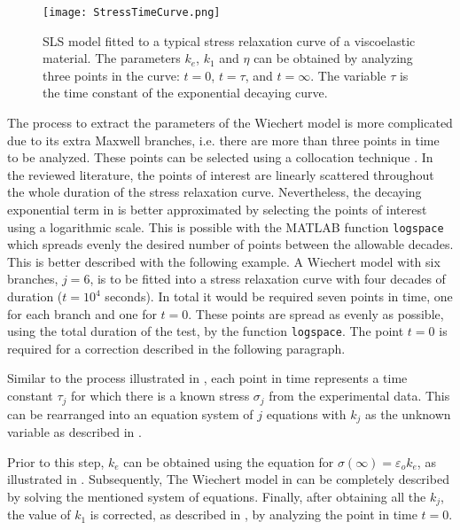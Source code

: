 \begin{figure}[htb!]
	\centering
    \texttt{[image: StressTimeCurve.png]}
    \caption{SLS model fitted to a typical stress relaxation curve of a viscoelastic material. The parameters $k_e$, $k_1$ and $\eta$ can be obtained by analyzing three points in the curve: $t=0$, $t=\tau$, and $t=\infty$. The variable $\tau$ is the time constant of the exponential decaying curve.}
    \label{fig:stressTimeCurve}
\end{figure}

The process to extract the parameters of the Wiechert model is more complicated due to its extra Maxwell branches, i.e. there are more than three points in time to be analyzed. These points can be selected using a collocation technique \cite{roylance2001engineering,machiraju2006viscoelastic}. In the reviewed literature, the points of interest are linearly scattered throughout the whole duration of the stress relaxation curve. Nevertheless, the decaying exponential term in  is better approximated by selecting the points of interest using a logarithmic scale. This is possible with the MATLAB function \texttt{logspace} which spreads evenly the desired number of points between the allowable decades. 
This is better described with the following example. A Wiechert model with six branches, $j=6$, is to be fitted into a stress relaxation curve with four decades of duration ($t=10^4$ seconds). In total it would be required seven points in time, one for each branch and one for $t=0$. These points are spread as evenly as possible, using the total duration of the test, by the function \texttt{logspace}. The point $t=0$ is required for a correction described in the following paragraph. 

Similar to the process illustrated in , each point in time represents a time constant $\tau_j$ for which there is a known stress $\sigma_j$ from the experimental data. This can be rearranged into an equation system of $j$ equations with $k_j$ as the unknown variable as described in \cite{machiraju2006viscoelastic}. 


Prior to this step, $k_e$ can be obtained using the equation for $\sigma(\infty)=\varepsilon_o k_e$, as illustrated in . Subsequently, The Wiechert model in  can be completely described by solving the mentioned system of equations. Finally, after obtaining all the $k_j$, the value of $k_1$ is corrected, as described in \cite{roylance2001engineering}, by analyzing the point in time $t=0$.

